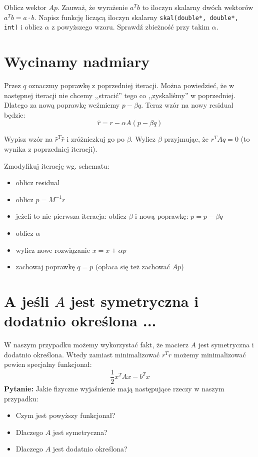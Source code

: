 \documentclass{instrukcja}
\begin{document}
\begin{zad} Oblicz wektor $Ap$. Zauważ, że wyrażenie $a^Tb$ to iloczyn skalarny dwóch wektorów $a^Tb = a\cdot b$. Napisz funkcję liczącą iloczyn skalarny {\tt skal(double*, double*, int)} i oblicz $\alpha$ z powyższego wzoru. Sprawdź zbieżność przy takim $\alpha$.\end{zad}

\section{Wycinamy nadmiary}
Przez $q$ oznaczmy poprawkę z poprzedniej iteracji. Można powiedzieć, że w następnej iteracji nie chcemy ,,stracić'' tego co ,,zyskaliśmy'' w poprzedniej. Dlatego za nową poprawkę weźmiemy $p - \beta q$. Teraz wzór na nowy residual będzie:
\[\hat{r} = r - \alpha A(p-\beta q)\]
\begin{zad} Wypisz wzór na $\hat{r}^T\hat{r}$ i zróżniczkuj go po $\beta$. Wylicz $\beta$ przyjmując, że $r^T Aq = 0$ (to wynika z poprzedniej iteracji).\end{zad}

\begin{zad} Zmodyfikuj iterację wg. schematu:
\begin{itemize}
\item oblicz residual
\item oblicz $p=M^{-1}r$
\item jeżeli to nie pierwsza iteracja: oblicz $\beta$ i nową poprawkę: $p=p-\beta q$
\item oblicz $\alpha$
\item wylicz nowe rozwiązanie $x=x+\alpha p$
\item zachowaj poprawkę $q=p$ (opłaca się też zachować $Ap$)
\end{itemize}
\end{zad}

\section{A jeśli $A$ jest symetryczna i dodatnio określona ...}
W naszym przypadku możemy wykorzystać fakt, że macierz $A$ jest symetryczna i dodatnio określona. Wtedy zamiast minimalizować $r^Tr$ możemy minimalizować pewien specjalny funkcjonał:
\[\frac{1}{2}x^TAx - b^Tx\]
{\bf Pytanie:} Jakie fizyczne wyjaśnienie mają następujące rzeczy w naszym przypadku:
\begin{itemize}
\item Czym jest powyższy funkcjonał?
\item Dlaczego $A$ jest symetryczna?
\item Dlaczego $A$ jest dodatnio określona?
\end{itemize}
\end{document}
